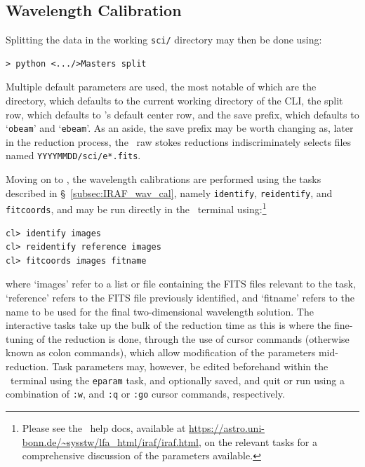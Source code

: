 \subsection{Wavelength Calibration} \label{subsec:reduc_wav}

Splitting the data in the working \texttt{sci/} directory may then be done using:

\begin{verbatim}> python <.../>Masters split\end{verbatim}

Multiple default parameters are used, the most notable of which are the directory, which defaults to the current working directory of the \gls{CLI}, the split row, which defaults to \polsalt's default center row, and the save prefix, which defaults to `\texttt{obeam}' and `\texttt{ebeam}'. As an aside, the save prefix may be worth changing as, later in the reduction process, the \polsalt\ raw stokes reductions indiscriminately selects files named \texttt{YYYYMMDD/sci/e*.fits}.
\prgph

Moving on to \iraf, the wavelength calibrations are performed using the tasks described in \S~\ref{subsec:IRAF_wav_cal}, namely \texttt{identify}, \texttt{reidentify}, and \texttt{fitcoords}, and may be run directly in the \iraf\ terminal using:\footnote{Please see the \iraf\ help docs, available at \url{https://astro.uni-bonn.de/~sysstw/lfa_html/iraf/iraf.html}, on the relevant tasks for a comprehensive discussion of the parameters available.}

\begin{verbatim}
cl> identify images
cl> reidentify reference images
cl> fitcoords images fitname
\end{verbatim}

\noindent where `images' refer to a list or file containing the \gls{FITS} files relevant to the task, `reference' refers to the \gls{FITS} file previously identified, and `fitname' refers to the name to be used for the final two-dimensional wavelength solution. The interactive tasks take up the bulk of the reduction time as this is where the fine-tuning of the reduction is done, through the use of cursor commands (otherwise known as colon commands), which allow modification of the parameters mid-reduction. Task parameters may, however, be edited beforehand within the \iraf\ terminal using the \texttt{eparam} task, and optionally saved, and quit or run using a combination of \texttt{:w}, and \texttt{:q} or \texttt{:go} cursor commands, respectively.
\prgph

